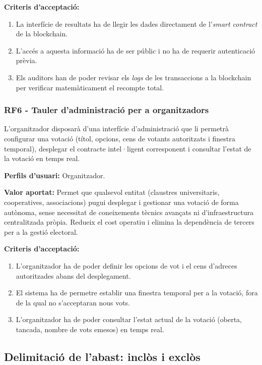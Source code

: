 \documentclass[12pt,a4paper,catalan]{article}
\begin{document}
\textbf{Criteris d'acceptació:}
\begin{enumerate}[label=\roman*.]
    \item La interfície de resultats ha de llegir les dades directament de l'\textit{smart contract} de la blockchain.
    \item L'accés a aquesta informació ha de ser públic i no ha de requerir autenticació prèvia.
    \item Els auditors han de poder revisar els \textit{logs} de les transaccions a la blockchain per verificar matemàticament el recompte total.
\end{enumerate}

\subsubsection*{RF6 - Tauler d'administració per a organitzadors}

L'organitzador disposarà d'una interfície d'administració que li permetrà configurar una votació (títol, opcions, cens de votants autoritzats i finestra temporal), desplegar el contracte intel·ligent corresponent i consultar l'estat de la votació en temps real.

\textbf{Perfils d'usuari:} Organitzador.

\textbf{Valor aportat:} Permet que qualsevol entitat (claustres universitaris, cooperatives, associacions) pugui desplegar i gestionar una votació de forma autònoma, sense necessitat de coneixements tècnics avançats ni d'infraestructura centralitzada pròpia. Redueix el cost operatiu i elimina la dependència de tercers per a la gestió electoral.

\textbf{Criteris d'acceptació:}
\begin{enumerate}[label=\roman*.]
    \item L'organitzador ha de poder definir les opcions de vot i el cens d'adreces autoritzades abans del desplegament.
    \item El sistema ha de permetre establir una finestra temporal per a la votació, fora de la qual no s'acceptaran nous vots.
    \item L'organitzador ha de poder consultar l'estat actual de la votació (oberta, tancada, nombre de vots emesos) en temps real.
\end{enumerate}

\subsection{Delimitació de l'abast: inclòs i exclòs}
\end{document}

